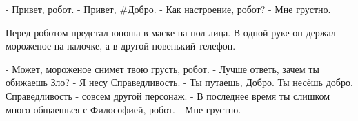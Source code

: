 - Привет, робот.
- Привет, #Добро.
- Как настроение, робот?
- Мне грустно.

Перед роботом предстал юноша в маске на пол-лица. В одной руке он держал мороженое на палочке, а в другой новенький телефон.

- Может, мороженое снимет твою грусть, робот.
- Лучше ответь, зачем ты обижаешь Зло?
- Я несу Справедливость.
- Ты путаешь, Добро. Ты несёшь добро. Справедливость - совсем другой персонаж.
- В последнее время ты слишком много общаешься с Философией, робот. 
- Мне грустно.